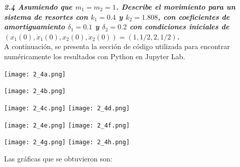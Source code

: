 \documentclass[12pt]{article}
\begin{document}
\textit{\textbf{2.4 Asumiendo que $m_1$$=m_2$$=1$. Describe el movimiento para un sistema de resortes con $k_1$$=0.4$ y $k_2$$=1.808$, con coeficientes de amortiguamiento $\delta_1$$=0.1$ y $\delta_2$$=0.2$ con condiciones iniciales de $(x_1(0), \dot x_1(0), x_2(0), \dot x_2(0))=(1,1/2,2,1/2)$.}}\\

A continuación, se presenta la sección de código utilizada para encontrar numéricamente los resultados con Python en Jupyter Lab.
\begin{center}
    \texttt{[image: 2\_4a.png]}
\end{center}
\begin{center}
    \texttt{[image: 2\_4b.png]}
\end{center}
\begin{center}
    \texttt{[image: 2\_4c.png]}\hspace*{\fill}
    \texttt{[image: 2\_4d.png]}\\
\end{center}
\begin{center}
    \texttt{[image: 2\_4e.png]}\hspace*{\fill}
    \texttt{[image: 2\_4f.png]}\\
\end{center}
\begin{center}
    \texttt{[image: 2\_4g.png]}\hspace*{\fill}
    \texttt{[image: 2\_4h.png]}\\
\end{center}
Las gráficas que se obtuvieron son:
\end{document}
